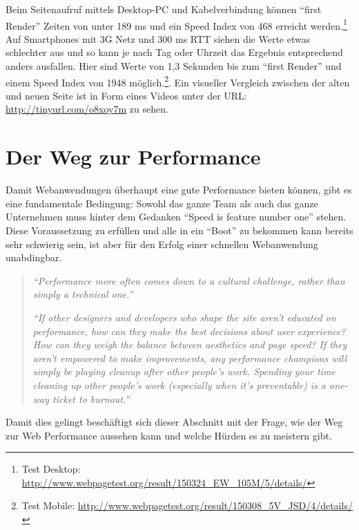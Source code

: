 		Beim Seitenaufruf mittels Desktop-PC und Kabelverbindung können "`first Render"' Zeiten von unter 189 ms und ein Speed Index von 468 erreicht werden.\footnote{Test Desktop: \url{http://www.webpagetest.org/result/150324_EW_105M/5/details/}} Auf Smartphones mit 3G Netz und 300 ms RTT siehen die Werte etwas schlechter aus und so kann je nach Tag oder Uhrzeit das Ergebnis entsprechend anders ausfallen. Hier sind Werte von 1,3 Sekunden bis zum "`first Render"' und einem Speed Index von 1948 möglich.\footnote{Test Mobile: \url{http://www.webpagetest.org/result/150308_5V_JSD/4/details/}}. Ein visueller Vergleich zwischen der alten und neuen Seite ist in Form eines Videos unter der URL: \url{http://tinyurl.com/o8xoy7m} zu sehen.
		


\pagebreak

\section{Der Weg zur Performance} %
\label{sec:der_weg_zur_performance}
	Damit Webanwendungen überhaupt eine gute Performance  bieten können, gibt es eine fundamentale Bedingung: Sowohl das ganze Team als auch das ganze Unternehmen muss hinter dem Gedanken "`Speed is feature number one"'\autocite{holzle10} stehen. Diese Voraussetzung zu erfüllen und alle in ein "`Boot"' zu bekommen kann bereits sehr schwierig sein, ist aber für den Erfolg einer schnellen Webanwendung unabdingbar.

	\begin{quote}
		\textit{"`Performance more often comes down to a cultural challenge, rather than simply a technical one."'} \autocite[p. 13]{kovalcin15}

		\textit{"`If other designers and developers who shape the site aren’t educated on performance, how can they make the best decisions about user experience? How can they weigh the balance between aesthetics and page speed? If they aren’t empowered to make improvements, any performance champions will simply be playing cleanup after other people’s work. Spending your time cleaning up other people’s work (especially when it’s preventable) is a one-way ticket to burnout."'} \autocite{hogan14}
	\end{quote}

	Damit dies gelingt beschäftigt sich dieser Abschnitt mit der Frage, wie der Weg zur Web Performance aussehen kann und welche Hürden es zu meistern gibt.

